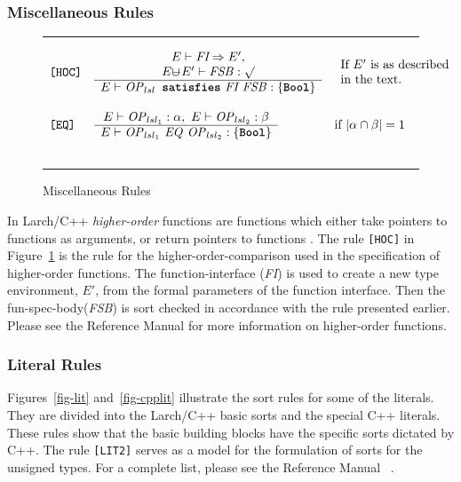 \documentclass[12pt]{article} %
\newcommand{\reserved}[1]{\textbf{\texttt{#1}}} %
\newcommand{\RULELAB}[1]{\texttt{#1}}
\newcommand{\uminus}{\mbox{$\cup\!\!\!\!-$}}
\newcommand{\UNSPACEFORBOX}{\vspace{-2ex}}
\newcommand{\HLINE}{\UNSPACEFORBOX%
\begin{flushleft}\rule{\textwidth}{0.01in}\end{flushleft}%
\UNSPACEFORBOX}
\newenvironment{BFIGURE}{

\begin{figure}
\small
\HLINE
}{
\HLINE
\normalsize
\end{figure}
}
\begin{document}
\subsubsection{Miscellaneous Rules}
\label{miscrules}
\begin{BFIGURE}
\begin{displaymath}
\begin{array}{lll}
\RULELAB{[HOC]} &
\begin{array}{c}
E \vdash \mbox{\it FI} \Rightarrow E',\\
E \uminus E'\vdash \mbox{\textit{FSB}}: \surd \\
\hline
E \vdash \mbox{\textit{OP}$_{lsl}$}\mbox{\reserved{ satisfies} \textit{FI FSB}}:\{\reserved{Bool}\}
\end{array}
&
\begin{array}{l}
\mbox{If $E'$ is as described } \\
\mbox{in the text.}
\end{array}
\\
~\\
\RULELAB{[EQ]} &
\begin{array}{c}
E \vdash \mbox{\textit{OP}$_{{lsl}_1}$}:\alpha,~E \vdash \mbox{\textit{OP}$_{{lsl}_2}$}:\beta \\
\hline
E \vdash \mbox{\textit{OP}$_{{lsl}_1}$ \textit{EQ} \textit{OP}$_{{lsl}_2}$}:\{\reserved{Bool}\}
\end{array}
& 
\mbox{if $| \alpha \cap  \beta | = 1$}
\\
~\\
\end{array}
\end{displaymath}
\caption{Miscellaneous Rules}
\label{fig-three}
\end{BFIGURE}
In Larch/C++ \emph{higher-order} functions are functions which either
take pointers to functions as arguments, or return pointers to
functions \cite{Leavens96c}. The rule \RULELAB{[HOC]} in
Figure~\ref{fig-three} is the rule for the higher-order-comparison
used in the specification of higher-order functions. The
function-interface (\textit{FI}) is used to create a new type
environment, $E'$, from the formal parameters of the function
interface. Then the fun-spec-body(\textit{FSB}) is sort checked in
accordance with the rule presented earlier. Please see the Reference
Manual \cite[Section 6.12]{Leavens96c} for more information on
higher-order functions.

\subsubsection{Literal Rules}
Figures~\ref{fig-lit} and~\ref{fig-cpplit} illustrate the sort rules
for some of the literals. They are divided into the Larch/C++ basic
sorts and the special C++ literals. These rules show that the basic
building blocks have the specific sorts dictated by C++. The rule
\RULELAB{[LIT2]} serves as a model for the formulation of sorts for
the unsigned types. For a complete list, please see the Reference
Manual ~\cite[Chapter 11]{Leavens96c}.
\end{document}
